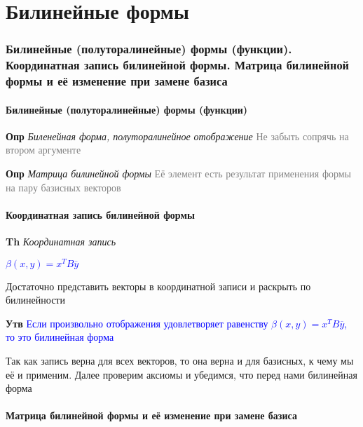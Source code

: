 \documentclass[a4paper, 14pt]{article}
\begin{document}
    
    
     \part*{Билинейные формы}
    
    \section{Билинейные (полуторалинейные) формы (функции).
    Координатная запись билинейной формы.
    Матрица билинейной формы и её изменение при замене базиса}
    
    \subsection{}
    
    \subsection{Билинейные (полуторалинейные) формы (функции)}
    
    \textbf{Опр} \textit{Биленейная форма, полуторалинейное отображение} \textcolor{gray}{Не забыть сопрячь на втором
    аргументе}
    
    \textbf{Опр} \textit{Матрица билинейной формы} \textcolor{gray}{Её элемент есть результат применения формы на
    пару базисных векторов}
    
    \subsection{Координатная запись билинейной формы}
    
    \textbf{Th} \textit{Координатная запись}
    
    \textcolor{blue}{$\beta (x, y) = x^T B \overline{y}$}
    
    Достаточно представить векторы в координатной записи и раскрыть по билинейности
    
    \textbf{Утв} \textcolor{blue}{Если произвольно отображения удовлетворяет
    равенству $\beta (x, y) = x^T B \overline{y}$, то это билинейная форма}
    
    Так как запись верна для всех векторов, то она верна и для базисных, к чему мы её и применим.
    Далее проверим аксиомы и убедимся, что перед нами билинейная форма
    
    \subsection{Матрица билинейной формы и её изменение при замене базиса}
    
\end{document}
